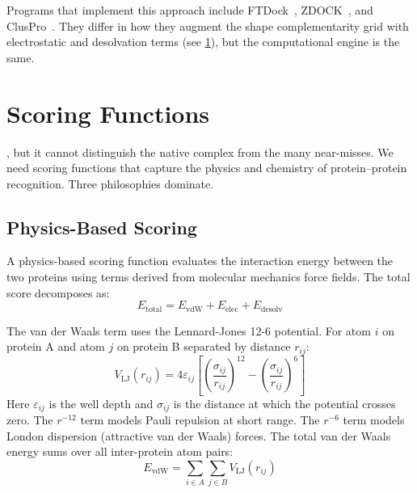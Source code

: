 Programs that implement this approach include FTDock~\cite{gabb1997}, ZDOCK~\cite{chen2003zdock}, and ClusPro~\cite{kozakov2017cluspro}.
They differ in how they augment the shape complementarity grid with electrostatic and desolvation terms (see \cref{sec:scoring-functions}), but the computational engine is the same.

\section{Scoring Functions}
\label{sec:scoring-functions}

, but it cannot distinguish the native complex from the many near-misses.
We need scoring functions that capture the physics and chemistry of protein--protein recognition.
Three philosophies dominate.

\subsection{Physics-Based Scoring}

A physics-based scoring function evaluates the interaction energy between the two proteins using terms derived from molecular mechanics force fields.
The total score decomposes as:
\begin{equation}
\label{eq:physics-score}
E_\text{total} = E_\text{vdW} + E_\text{elec} + E_\text{desolv}
\end{equation}

The van der Waals term uses the Lennard-Jones 12-6 potential.
For atom $i$ on protein A and atom $j$ on protein B separated by distance $r_{ij}$:
\begin{equation}
\label{eq:lj-docking-score}
V_\text{LJ}(r_{ij}) = 4\varepsilon_{ij}\left[\left(\frac{\sigma_{ij}}{r_{ij}}\right)^{12} - \left(\frac{\sigma_{ij}}{r_{ij}}\right)^{6}\right]
\end{equation}
Here $\varepsilon_{ij}$ is the well depth and $\sigma_{ij}$ is the distance at which the potential crosses zero.
The $r^{-12}$ term models Pauli repulsion at short range.
The $r^{-6}$ term models London dispersion (attractive van der Waals) forces.
The total van der Waals energy sums over all inter-protein atom pairs:
\begin{equation}
\label{eq:evdw}
E_\text{vdW} = \sum_{i \in A}\sum_{j \in B} V_\text{LJ}(r_{ij})
\end{equation}

